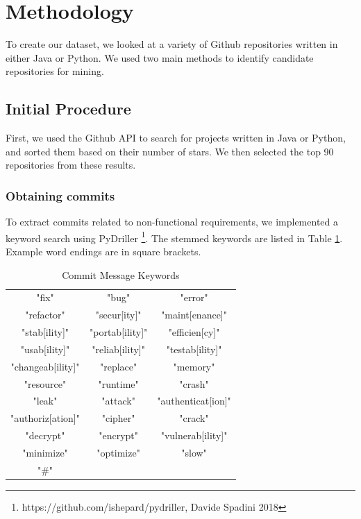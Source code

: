 \documentclass[sigconf]{acmart}
\begin{document}
\section{Methodology}
To create our dataset, we looked at a variety of Github repositories written in either Java or Python. 
We used two main methods to identify candidate repositories for mining. 
 
\subsection{Initial Procedure}
First, we used the Github API to search for projects written in Java or Python, and sorted them based on their number of stars. We then selected the top 90 repositories from these results. 

\subsubsection{Obtaining commits}
To extract commits related to non-functional requirements, we implemented a keyword search using PyDriller \footnote{https://github.com/ishepard/pydriller, Davide Spadini 2018}. The stemmed keywords are listed in Table \ref{tab:kwds}. Example word endings are in square brackets.

\begin{table}
  \caption{Commit Message Keywords}
  \label{tab:kwds}
\begin{tabular}{ c c c }
  \toprule
   "fix"             &"bug"           &"error"\\
   "refactor"		 &"secur[ity]"    &"maint[enance]"\\
   "stab[ility]"	 &"portab[ility]" &"efficien[cy]"\\
   "usab[ility]" 	 &"reliab[ility]" &"testab[ility]"\\
   "changeab[ility]" &"replace"       &"memory"\\
   "resource"        &"runtime"       &"crash"\\
   "leak"            &"attack"        &"authenticat[ion]"\\
   "authoriz[ation]" &"cipher"        &"crack" \\ 
   "decrypt"         &"encrypt"       &"vulnerab[ility]"\\ 
   "minimize"        &"optimize"      &"slow"\\
   "\#"              &                &\\
  \bottomrule
\end{tabular}
\end{table}
\end{document}
